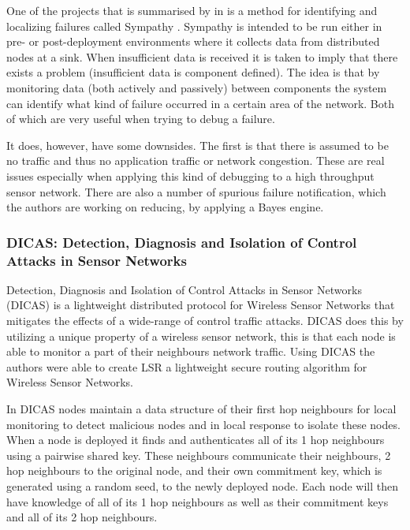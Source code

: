 One of the projects that is summarised by \citeauthor{herbert2007adaptive} in \cite{herbert2007adaptive} is a method for identifying and localizing failures called Sympathy \cite{ramanathan2005sympathy}. Sympathy is intended to be run either in pre- or post-deployment environments where it collects data from distributed nodes at a sink. When insufficient data is received it is taken to imply that there exists a problem (insufficient data is component defined). The idea is that by monitoring data (both actively and passively) between components the system can identify what kind of failure occurred in a certain area of the network. Both of which are very useful when trying to debug a failure.

It does, however, have some downsides. The first is that there is assumed to be no traffic and thus no application traffic or network congestion. These are real issues especially when applying this kind of debugging to a high throughput sensor network. There are also a number of spurious failure notification, which the authors are working on reducing, by applying a Bayes engine.

\subsubsection*{DICAS: Detection, Diagnosis and Isolation of Control Attacks in Sensor Networks}

Detection, Diagnosis and Isolation of Control Attacks in Sensor Networks (DICAS) \cite{dicaspaper} is a lightweight distributed protocol for Wireless Sensor Networks that mitigates the effects of a wide-range of control traffic attacks. DICAS does this by utilizing a unique property of a wireless sensor network, this is that each node is able to monitor a part of their neighbours network traffic. Using DICAS the authors were able to create LSR a lightweight secure routing algorithm for Wireless Sensor Networks.

In DICAS nodes maintain a data structure of their first hop neighbours for local monitoring to detect malicious nodes and in local response to isolate these nodes. When a node is deployed it finds and authenticates all of its 1 hop neighbours using a pairwise shared key. These neighbours communicate their neighbours, 2 hop neighbours to the original node, and their own commitment key, which is generated using a random seed, to the newly deployed node. Each node will then have knowledge of all of its 1 hop neighbours as well as their commitment keys and all of its 2 hop neighbours.

